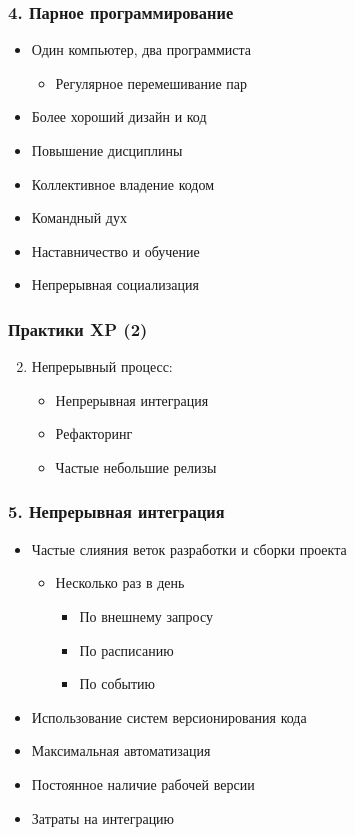 \documentclass{../../slides-style}
\begin{document}
    \begin{frame}
        \frametitle{4. Парное программирование}
        \begin{itemize}
            \item Один компьютер, два программиста
            \begin{itemize}
                \item Регулярное перемешивание пар
            \end{itemize}
            \item Более хороший дизайн и код
            \item Повышение дисциплины
            \item Коллективное владение кодом
            \item Командный дух
            \item Наставничество и обучение
            \item Непрерывная социализация
        \end{itemize}
    \end{frame}

    \begin{frame}
        \frametitle{Практики XP (2)}
        \begin{enumerate}
            \setcounter{enumi}{1}
            \item Непрерывный процесс:
            \begin{itemize}
                \item Непрерывная интеграция 
                \item Рефакторинг 
                \item Частые небольшие релизы
            \end{itemize}
        \end{enumerate}
    \end{frame}

    \begin{frame}
        \frametitle{5. Непрерывная интеграция}
        \begin{itemize}
            \item Частые слияния веток разработки и сборки проекта
            \begin{itemize}
                \item Несколько раз в день
                \begin{itemize}
                    \item По внешнему запросу
                    \item По расписанию
                    \item По событию
                \end{itemize}
            \end{itemize}
            \item Использование систем версионирования кода
            \item Максимальная автоматизация
            \item Постоянное наличие рабочей версии
            \item Затраты на интеграцию
        \end{itemize}
    \end{frame}
\end{document}
